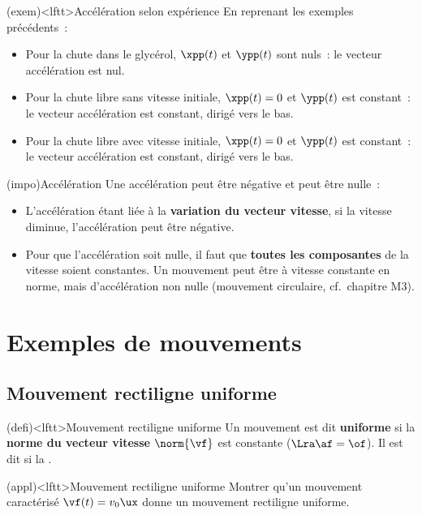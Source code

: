 \documentclass[../../main/main.tex]{subfiles}
\begin{document}
\begin{tcb}(exem)<lftt>{Accélération selon expérience}
	En reprenant les exemples précédents~:
	\begin{itemize}
		\item Pour la chute dans le glycérol, $\xpp(t)$ et $\ypp(t)$ sont nuls~: le
		      vecteur accélération est nul.
		\item Pour la chute libre sans vitesse initiale, $\xpp(t) = 0$ et $\ypp(t)$
		      est constant~: le vecteur accélération est constant, dirigé vers le
		      bas.
		\item Pour la chute libre avec vitesse initiale, $\xpp(t) = 0$ et $\ypp(t)$
		      est constant~: le vecteur accélération est constant, dirigé vers le
		      bas.
	\end{itemize}
\end{tcb}

\begin{tcb}(impo){Accélération}
	Une accélération peut être négative et peut être nulle~:
	\begin{itemize}
		\item L'accélération étant liée à la \textbf{variation du
			      vecteur vitesse}, si la vitesse diminue, l'accélération peut être
		      négative.
		\item Pour que l'accélération soit nulle, il faut que \textbf{toutes les
			      composantes} de la vitesse soient constantes. Un mouvement peut
		      être à vitesse constante en norme, mais d'accélération non nulle
		      (mouvement circulaire, cf.\ chapitre M3).
	\end{itemize}
\end{tcb}

\section{Exemples de mouvements}

\subsection{Mouvement rectiligne uniforme}
\begin{tcb}(defi)<lftt>{Mouvement rectiligne uniforme}
	Un mouvement est dit \textbf{uniforme} si la \textbf{norme du vecteur vitesse}
	$\norm{\vf}$ est constante ($\Lra \af = \of$). Il est dit  si
	la .
\end{tcb}

\begin{tcb*}(appl)<lftt>{Mouvement rectiligne uniforme}
	Montrer qu'un mouvement caractérisé $\vf(t) = v_0\ux$ donne un mouvement
	rectiligne uniforme.
	\tcblower
\end{tcb*}
\end{document}
